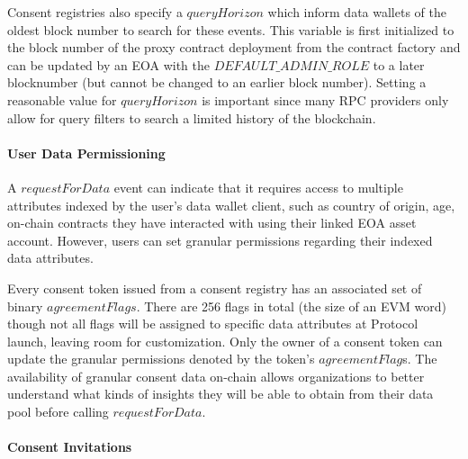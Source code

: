 Consent registries also specify a $queryHorizon$ which inform data wallets of the oldest block number to search for these events. This variable is 
first initialized to the block number of the proxy contract deployment from the contract factory and can be updated by an EOA with the $DEFAULT\_ADMIN\_ROLE$
to a later blocknumber (but cannot be changed to an earlier block number). Setting a reasonable value for $queryHorizon$ is important since many RPC providers
only allow for query filters to search a limited history of the blockchain.

\paragraph{User Data Permissioning}
\label{section:UserPermissions}

A $requestForData$ event can indicate that it requires access to multiple attributes indexed by the user's data wallet client, such as country of origin, age,
on-chain contracts they have interacted with using their linked EOA asset account. However, users can set granular permissions regarding their indexed data 
attributes. 

Every consent token issued from a consent registry has an associated set of binary $agreementFlags$. There are 256 flags in total (the size of an EVM word) 
though not all flags will be assigned to specific data attributes at Protocol launch, leaving room for customization. Only the owner of a consent token can 
update the granular permissions denoted by the token's $agreementFlag$s. The availability of granular consent data on-chain allows organizations to better 
understand what kinds of insights they will be able to obtain from their data pool before calling $requestForData$. 

\paragraph{Consent Invitations}
\label{section:ConsentInvitations}

